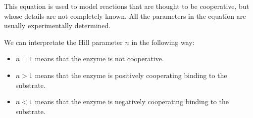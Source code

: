 This equation is used to model reactions that are thought to be cooperative, but 
whose details are not completely known. All the parameters in the equation are 
usually experimentally determined.

We can interpretate the Hill parameter $n$ in the following way:
\begin{itemize}
    \item $n = 1$ means that the enzyme is not cooperative.
    \item $n > 1$ means that the enzyme is positively cooperating binding to the 
          substrate.
    \item $n < 1$ means that the enzyme is negatively cooperating binding to the
            substrate.
\end{itemize}
